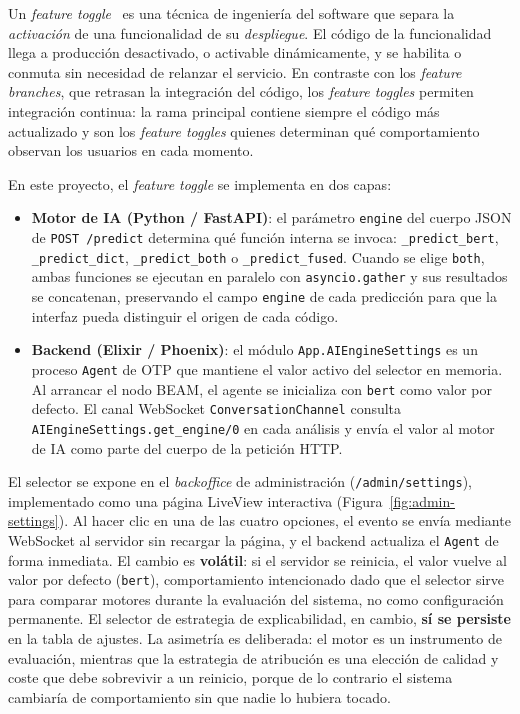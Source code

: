 Un \emph{feature toggle}~\cite{Fowler17} es una técnica de ingeniería del software que separa la \emph{activación} de una funcionalidad de su \emph{despliegue}. El código de la funcionalidad llega a producción desactivado, o activable dinámicamente, y se habilita o conmuta sin necesidad de relanzar el servicio. En contraste con los \emph{feature branches}, que retrasan la integración del código, los \emph{feature toggles} permiten integración continua: la rama principal contiene siempre el código más actualizado y son los \emph{feature toggles} quienes determinan qué comportamiento observan los usuarios en cada momento.

En este proyecto, el \emph{feature toggle} se implementa en dos capas:

\begin{itemize}
 \item \textbf{Motor de IA (Python / FastAPI)}: el parámetro \texttt{engine} del cuerpo JSON de \texttt{POST /predict} determina qué función interna se invoca: \texttt{\_predict\_bert}, \texttt{\_predict\_dict}, \texttt{\_predict\_both} o \texttt{\_predict\_fused}. Cuando se elige \texttt{\textquotedbl{}both\textquotedbl{}}, ambas funciones se ejecutan en paralelo con \texttt{asyncio.gather} y sus resultados se concatenan, preservando el campo \texttt{\textquotedbl{}engine\textquotedbl{}} de cada predicción para que la interfaz pueda distinguir el origen de cada código.

 \item \textbf{Backend (Elixir / Phoenix)}: el módulo \texttt{App.AIEngineSettings} es un proceso \texttt{Agent} de OTP que mantiene el valor activo del selector en memoria. Al arrancar el nodo BEAM, el agente se inicializa con \texttt{\textquotedbl{}bert\textquotedbl{}} como valor por defecto. El canal WebSocket \texttt{ConversationChannel} consulta \texttt{AIEngineSettings.get\_engine/0} en cada análisis y envía el valor al motor de IA como parte del cuerpo de la petición HTTP.
\end{itemize}

El selector se expone en el \emph{backoffice} de administración (\texttt{/admin/settings}), implementado como una página LiveView interactiva (Figura~\ref{fig:admin-settings}). Al hacer clic en una de las cuatro opciones, el evento se envía mediante WebSocket al servidor sin recargar la página, y el backend actualiza el \texttt{Agent} de forma inmediata. El cambio es \textbf{volátil}: si el servidor se reinicia, el valor vuelve al valor por defecto (\texttt{\textquotedbl{}bert\textquotedbl{}}), comportamiento intencionado dado que el selector sirve para comparar motores durante la evaluación del sistema, no como configuración permanente. El selector de estrategia de explicabilidad, en cambio, \textbf{sí se persiste} en la tabla de ajustes. La asimetría es deliberada: el motor es un instrumento de evaluación, mientras que la estrategia de atribución es una elección de calidad y coste que debe sobrevivir a un reinicio, porque de lo contrario el sistema cambiaría de comportamiento sin que nadie lo hubiera tocado.

